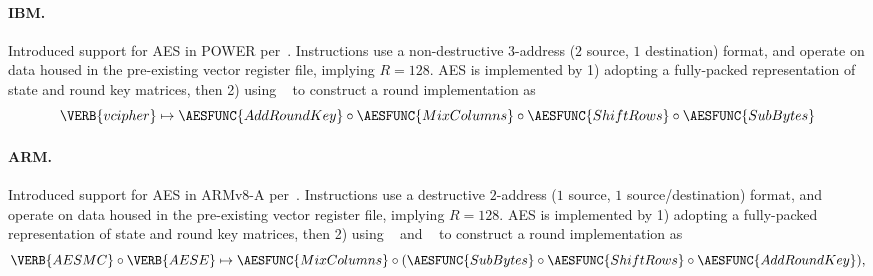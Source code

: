 \paragraph {IBM.}
      Introduced support for AES in 
      POWER
      per~\cite[Section 6.11.1]{POWER:18}.
      Instructions use a
      non-destructive $3$-address ($2$ source, $1$        destination)
      format,
      and operate on data housed in the pre-existing
      vector 
      register file, implying $R = 128$.
      AES is implemented by
      1) adopting a 
          fully-packed
         representation of state and round key matrices,
         then
      2) using
                  ~\cite[Page 304]{POWER:18}
         to construct a round implementation as
         \[
         \VERB{vcipher} \mapsto \AESFUNC{AddRoundKey} \circ \AESFUNC{MixColumns} \circ \AESFUNC{ShiftRows} \circ \AESFUNC{SubBytes}
         \]

\paragraph{ARM.}
      Introduced support for AES in 
      ARMv8-A
      per~\cite[Section A2.3]{ARMv8-A:20}.
      Instructions use a
          destructive $2$-address ($1$ source, $1$ source/destination)  
      format,
      and operate on data housed in the pre-existing
      vector 
      register file, implying $R = 128$.
      AES is implemented by
      1) adopting a 
          fully-packed
         representation of state and round key matrices,
         then
      2) using
               ~\cite[Section C7.2.8 ]{ARMv8-A:20}
             and
              ~\cite[Section C7.2.10]{ARMv8-A:20}
         to construct a round implementation as
         \[
         \VERB{AESMC} \circ \VERB{AESE} \mapsto \AESFUNC{MixColumns} \circ ( \AESFUNC{SubBytes} \circ \AESFUNC{ShiftRows} \circ \AESFUNC{AddRoundKey} ) ,
         \]

